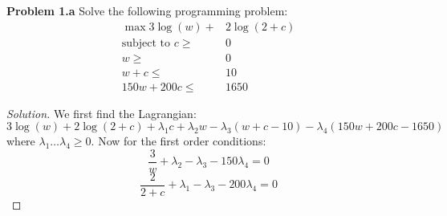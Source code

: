 \documentclass[12pt]{article}
\theoremstyle{definition}
\theoremstyle{remark}
\begin{document}
\maketitle

\textbf{Problem 1.a} Solve the following programming problem:
\begin{align*}
  \max 3 \log(w) +& 2 \log(2+c) \\
  \text{subject to } c \geq& 0 \\
  w \geq& 0 \\
  w+c \leq& 10 \\
  150w + 200c \leq& 1650
\end{align*}

\begin{proof}[Solution]

We first find the Lagrangian: $$3 \log(w) + 2 \log(2+c) + \lambda_1c + \lambda_2w - \lambda_3(w+c-10) - \lambda_4(150w + 200c - 1650)$$ where $\lambda_1 \ldots \lambda_4 \geq 0$. Now for the first order conditions:
\begin{equation}\label{eq:fo1} \frac{3}{w} + \lambda_2 - \lambda_3 - 150\lambda_4 = 0 \end{equation}
\begin{equation}\label{eq:f02} \frac{2}{2+c} + \lambda_1 - \lambda_3 - 200\lambda_4 =0 \end{equation}


\end{proof}
\end{document}
